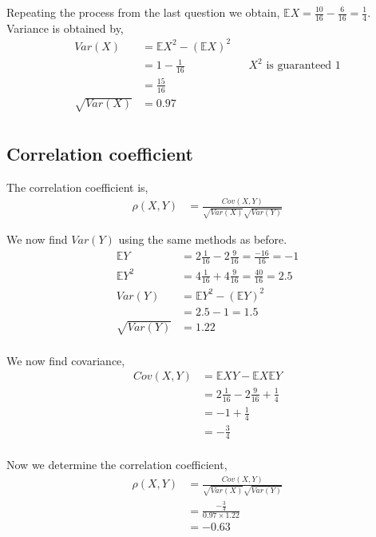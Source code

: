 \documentclass{article}
\newcommand{\expect}{\mathbb{E}}
\begin{document}
Repeating the process from the last question we obtain,
$\expect X = \frac{10}{16} - \frac{6}{16} = \frac{1}{4}$.
Variance is obtained by,
\begin{align*}
    Var(X) &= \expect X^2 - (\expect X)^2 \\
    &= 1 - \frac{1}{16} && \text{$X^2$ is guaranteed 1} \\
    &= \frac{15}{16} \\
    \sqrt{Var(X)} &= 0.97 \\
\end{align*}

\subsection{Correlation coefficient}
The correlation coefficient is,
\begin{align*}
    \rho(X,Y) &= \frac{Cov(X,Y)}{\sqrt{Var(X)}\sqrt{Var(Y)}}
\end{align*}

We now find $Var(Y)$ using the same methods as before.
\begin{align*}
    \expect Y &= 2\frac{1}{16} - 2\frac{9}{16} = \frac{-16}{16} = -1 \\
    \expect Y^2 &= 4\frac{1}{16} + 4\frac{9}{16} = \frac{40}{16} = 2.5 \\
    Var(Y) &= \expect Y^2 - (\expect Y)^2 \\
    &= 2.5 - 1 = 1.5 \\
    \sqrt{Var(Y)} &= 1.22 \\
\end{align*}
 
We now find covariance,
\begin{align*}
    Cov(X,Y) &= \expect XY - \expect X \expect Y \\
    &= 2\frac{1}{16} - 2\frac{9}{16} + \frac{1}{4} \\
    &= -1 + \frac{1}{4} \\
    &= -\frac{3}{4} \\
\end{align*}

Now we determine the correlation coefficient,
\begin{align*}
    \rho(X,Y) &= \frac{Cov(X,Y)}{\sqrt{Var(X)}\sqrt{Var(Y)}} \\
    &= \frac{-\frac{3}{4}}{0.97 \times 1.22} \\
    &= -0.63 \\
\end{align*}
\end{document}
